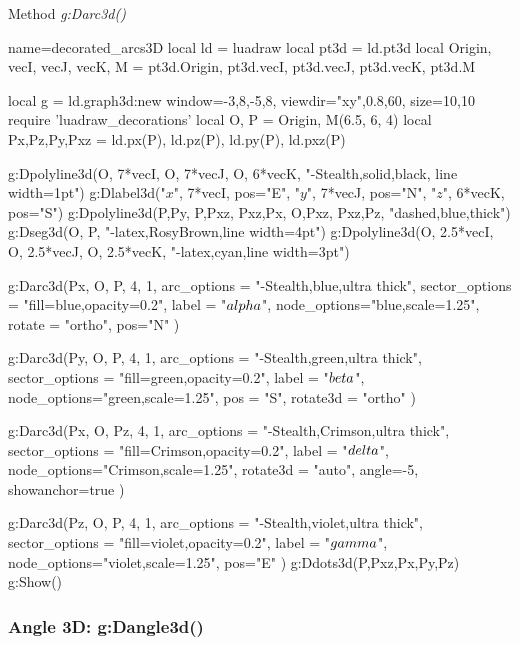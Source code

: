 \begin{demo}{Method \emph{g:Darc3d()}}
\begin{luadraw}{name=decorated_arcs3D}
local ld = luadraw
local pt3d = ld.pt3d
local Origin, vecI, vecJ, vecK, M = pt3d.Origin, pt3d.vecI, pt3d.vecJ, pt3d.vecK, pt3d.M

local g = ld.graph3d:new{ window={-3,8,-5,8}, viewdir={"xy",0.8,60}, size={10,10} }
require 'luadraw_decorations'
local O, P = Origin, M(6.5, 6, 4)
local Px,Pz,Py,Pxz = ld.px(P), ld.pz(P), ld.py(P), ld.pxz(P)

g:Dpolyline3d({{O, 7*vecI}, {O, 7*vecJ}, {O, 6*vecK}}, "-Stealth,solid,black, line width=1pt")
g:Dlabel3d("$x$", 7*vecI, {pos="E"}, "$y$", 7*vecJ, {pos="N"}, "$z$", 6*vecK, {pos="S"})
g:Dpolyline3d({{P,Py}, {P,Pxz}, {Pxz,Px}, {O,Pxz}, {Pxz,Pz}}, "dashed,blue,thick")
g:Dseg3d({O, P}, "-latex,RosyBrown,line width=4pt")
g:Dpolyline3d({{O, 2.5*vecI}, {O, 2.5*vecJ}, {O, 2.5*vecK}}, "-latex,cyan,line width=3pt")

g:Darc3d(Px, O, P, 4, 1, {
    arc_options = "-Stealth,blue,ultra thick",
    sector_options = "fill=blue,opacity=0.2",
    label = "$\\alpha$", node_options="blue,scale=1.25",
    rotate = "ortho", pos="N" })
     
g:Darc3d(Py, O, P, 4, 1, {
    arc_options = "-Stealth,green,ultra thick",
    sector_options = "fill=green,opacity=0.2",
    label = "$\\beta$", node_options="green,scale=1.25",
    pos = "S", rotate3d = "ortho"  }) 
     
g:Darc3d(Px, O, Pz, 4, 1, {
    arc_options = "-Stealth,Crimson,ultra thick",
    sector_options = "fill=Crimson,opacity=0.2",
    label = "$\\delta$", node_options="Crimson,scale=1.25",
    rotate3d = "auto", angle=-5,
    showanchor=true  })  

g:Darc3d(Pz, O, P, 4, 1, {
    arc_options = "-Stealth,violet,ultra thick",
    sector_options = "fill=violet,opacity=0.2",
    label = "$\\gamma$", node_options="violet,scale=1.25",
    pos="E"  }) 
g:Ddots3d({P,Pxz,Px,Py,Pz})     
g:Show()
\end{luadraw}
\end{demo}

\subsubsection{Angle 3D: g:Dangle3d()}

